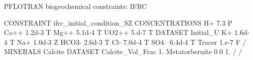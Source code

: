 \documentclass{beamer}
\newcommand\bluecolor[1]{{{\color{blue} #1}}}
\begin{document}
\begin{frame}
\end{frame}

\begin{frame}{PFLOTRAN biogeochemical constraints: IFRC}
\footnotesize
\begin{semiverbatim}
\bluecolor{CONSTRAINT} ifrc_initial_condition_SZ
  \bluecolor{CONCENTRATIONS}
    H+       7.3          \bluecolor{P}
    Ca++     1.2d-3       \bluecolor{T}
    Mg++     5.1d-4       \bluecolor{T}
    UO2++    5.d-7        \bluecolor{T DATASET} Initial_U
    K+       1.6d-4       \bluecolor{T}
    Na+      1.0d-3       \bluecolor{Z}
    HCO3-    2.6d-3       \bluecolor{T}
    Cl-      7.0d-4       \bluecolor{T}
    SO4--    6.4d-4       \bluecolor{T}
    Tracer   1.e-7        \bluecolor{F}    
  \bluecolor{/}
  \bluecolor{MINERALS}
    Calcite        \bluecolor{DATASET} Calcite_Vol_Frac 1.
    Metatorbernite 0.0   1.
  \bluecolor{/}
\bluecolor{/}
\end{semiverbatim}
\end{frame}
\end{document}
